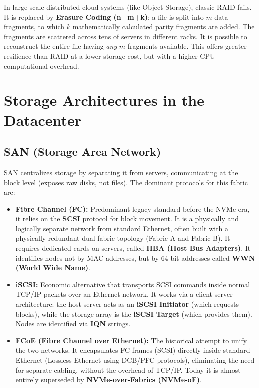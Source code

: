 In large-scale distributed cloud systems (like Object Storage), classic RAID fails. It is replaced by \textbf{Erasure Coding (n=m+k)}: a file is split into $m$ data fragments, to which $k$ mathematically calculated parity fragments are added. The fragments are scattered across tens of servers in different racks. It is possible to reconstruct the entire file having \textit{any} $m$ fragments available. This offers greater resilience than RAID at a lower storage cost, but with a higher CPU computational overhead.

\section{Storage Architectures in the Datacenter}

\subsection{SAN (Storage Area Network)}
SAN centralizes storage by separating it from servers, communicating at the block level (exposes raw disks, not files). The dominant protocols for this fabric are:
\begin{itemize}
    \item \textbf{Fibre Channel (FC):} Predominant legacy standard before the NVMe era, it relies on the \textbf{SCSI} protocol for block movement. It is a physically and logically separate network from standard Ethernet, often built with a physically redundant dual fabric topology (Fabric A and Fabric B). It requires dedicated cards on servers, called \textbf{HBA (Host Bus Adapters)}. It identifies nodes not by MAC addresses, but by 64-bit addresses called \textbf{WWN (World Wide Name)}.
    \item \textbf{iSCSI:} Economic alternative that transports SCSI commands inside normal TCP/IP packets over an Ethernet network. It works via a client-server architecture: the host server acts as an \textbf{iSCSI Initiator} (which requests blocks), while the storage array is the \textbf{iSCSI Target} (which provides them). Nodes are identified via \textbf{IQN} strings.
    \item \textbf{FCoE (Fibre Channel over Ethernet):} The historical attempt to unify the two networks. It encapsulates FC frames (SCSI) directly inside standard Ethernet (Lossless Ethernet using DCB/PFC protocols), eliminating the need for separate cabling, without the overhead of TCP/IP. Today it is almost entirely superseded by \textbf{NVMe-over-Fabrics (NVMe-oF)}.
\end{itemize}

